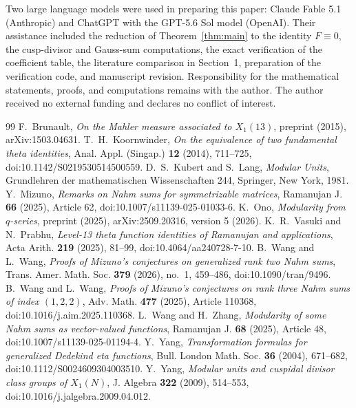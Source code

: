 \documentclass[11pt]{amsart}
\theoremstyle{remark}
\begin{document}
Two large language models were used in preparing this paper: Claude
Fable 5.1 (Anthropic) and ChatGPT with the GPT-5.6 Sol model (OpenAI).
Their assistance included the reduction of Theorem~\ref{thm:main} to the
identity $F\equiv0$, the cusp-divisor and Gauss-sum computations, the exact
verification of the coefficient table, the literature comparison in
Section~1, preparation of the verification code, and manuscript revision.
Responsibility for the mathematical statements, proofs, and computations
remains with the author. The author received no external funding and
declares no conflict of interest.

\begin{thebibliography}{99}
 F.~Brunault, \emph{On the Mahler measure associated to $X_1(13)$}, preprint (2015), arXiv:1503.04631.
 T.~H.~Koornwinder, \emph{On the equivalence of two fundamental theta identities}, Anal. Appl. (Singap.) \textbf{12} (2014), 711--725, doi:10.1142/S0219530514500559.
 D.~S.~Kubert and S.~Lang, \emph{Modular Units}, Grundlehren der mathematischen Wissenschaften 244, Springer, New York, 1981.
 Y.~Mizuno, \emph{Remarks on Nahm sums for symmetrizable matrices}, Ramanujan J. \textbf{66} (2025), Article 62, doi:10.1007/s11139-025-01033-6.
 K.~Ono, \emph{Modularity from $q$-series}, preprint (2025), arXiv:2509.20316, version 5 (2026).
 K.~R.~Vasuki and N.~Prabhu, \emph{Level-13 theta function identities of Ramanujan and applications}, Acta Arith. \textbf{219} (2025), 81--99, doi:10.4064/aa240728-7-10.
 B.~Wang and L.~Wang, \emph{Proofs of Mizuno's conjectures on generalized rank two Nahm sums}, Trans. Amer. Math. Soc. \textbf{379} (2026), no.~1, 459--486, doi:10.1090/tran/9496.
 B.~Wang and L.~Wang, \emph{Proofs of Mizuno's conjectures on rank three Nahm sums of index $(1,2,2)$}, Adv. Math. \textbf{477} (2025), Article 110368, doi:10.1016/j.aim.2025.110368.
 L.~Wang and H.~Zhang, \emph{Modularity of some Nahm sums as vector-valued functions}, Ramanujan J. \textbf{68} (2025), Article 48, doi:10.1007/s11139-025-01194-4.
 Y.~Yang, \emph{Transformation formulas for generalized Dedekind eta functions}, Bull. London Math. Soc. \textbf{36} (2004), 671--682, doi:10.1112/S0024609304003510.
 Y.~Yang, \emph{Modular units and cuspidal divisor class groups of $X_1(N)$}, J. Algebra \textbf{322} (2009), 514--553, doi:10.1016/j.jalgebra.2009.04.012.
\end{thebibliography}
\end{document}
